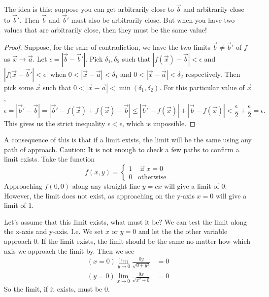 The idea is this: suppose you can get arbitrarily close to $\vec{b}$ and arbitrarily close to $\vec{b}'$. Then $\vec{b}$ and $\vec{b}'$ must also be arbitrarily close. But when you have two values that are arbitrarily close, then they must be the same value!
\begin{proof}
    Suppose, for the sake of contradiction, we have the two limits $\vec{b}\neq\vec{b}'$ of $f$ as $\vec{x}\to\vec{a}$. Let $\epsilon=|\vec{b}-\vec{b}'|$. Pick $\delta_1,\delta_2$ such that $|f(\vec{x})-\vec{b}|<\epsilon$ and $|f(\vec{x}-\vec{b}'|<\epsilon|$ when $0<|\vec{x}-\vec{a}|<\delta_1$ and $0<|\vec{x}-\vec{a}|<\delta_2$ respectively. Then pick some $\vec{x}$ such that $0<|\vec{x}-\vec{a}|<\min(\delta_1,\delta_2)$. For this particular value of $\vec{x}$,\[
        \epsilon=|\vec{b}'-\vec{b}|= |\vec{b}'-f(\vec{x})+f(\vec{x})-\vec{b}|\leq|\vec{b}'-f(\vec{x})|+|\vec{b}-f(\vec{x})| <\frac{\epsilon}{2}+\frac{\epsilon}{2}=\epsilon.
    \]
    This gives us the strict inequality $\epsilon<\epsilon$, which is impossible.
\end{proof}
\begin{remark}
    A consequence of this is that if a limit exists, the limit will be the same using any path of approach. Caution: It is not enough to check a few paths to confirm a limit exists. Take the function \[
        f(x,y)=\begin{cases}
            1 &\textrm { if } x=0\\
            0 &\textrm{otherwise }
        \end{cases}
    \]
    Approaching $f(0,0)$ along any straight line $y=cx$ will give a limit of $0$. However, the limit does not exist, as approaching on the y-axis $x=0$ will give a limit of $1$. 
\end{remark}
Let's assume that this limit exists, what must it be? We can test the limit along the x-axis and y-axis. I.e. We set $x$ or $y=0$ and let the the other variable approach $0$. If the limit exists, the limit should be the same no matter how which axis we approach the limit by. Then we see \begin{align*}
    (x=0) \lim_{y\to 0}\frac{0y}{\sqrt{0+y^2}}& =0 \\
    (y=0)\lim_{x\to 0}\frac{0x}{\sqrt{x^2+0}}&=0
\end{align*}
So the limit, if it exists, must be $0$.
